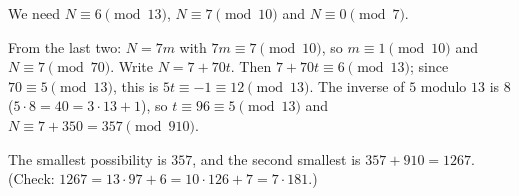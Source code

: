 We need $N\equiv6\pmod{13}$, $N\equiv7\pmod{10}$ and $N\equiv0\pmod7$.

From the last two: $N=7m$ with $7m\equiv7\pmod{10}$, so $m\equiv1\pmod{10}$ and $N\equiv7\pmod{70}$. Write $N=7+70t$. Then $7+70t\equiv6\pmod{13}$; since $70\equiv5\pmod{13}$, this is $5t\equiv-1\equiv12\pmod{13}$. The inverse of $5$ modulo $13$ is $8$ ($5\cdot8=40=3\cdot13+1$), so $t\equiv96\equiv5\pmod{13}$ and $N\equiv7+350=357\pmod{910}$.

The smallest possibility is $357$, and the second smallest is $357+910=\boxed{1267}$. (Check: $1267=13\cdot97+6=10\cdot126+7=7\cdot181$.)
